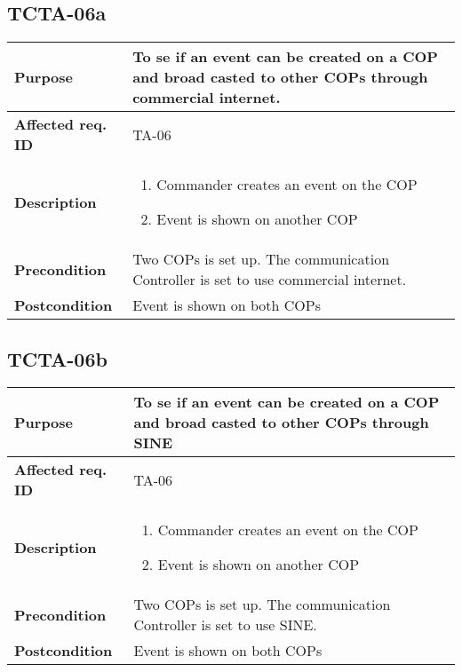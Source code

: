 \subsection{TCTA-06a}
\begin{tabular}{ l | m{11cm}}
	\textbf{Purpose}			& To se if an event can be created on a COP and broad casted to other COPs through commercial internet.  \\ \hline
	\textbf{Affected req. ID}	& TA-06 \\ \hline
	\textbf{Description}		& \begin{enumerate}
		\item Commander creates an event on the COP \item Event is shown on another COP
	\end{enumerate}\\
	\hline
	\textbf{Precondition}		& Two COPs is set up. The communication Controller is set to use commercial internet.\\ \hline
	\textbf{Postcondition}		& Event is shown on both COPs\\
\end{tabular}

\subsection{TCTA-06b}
\begin{tabular}{ l | m{11cm}}
	\textbf{Purpose}			& To se if an event can be created on a COP and broad casted to other COPs through SINE  \\ \hline
	\textbf{Affected req. ID}	& TA-06 \\ \hline
	\textbf{Description}		& \begin{enumerate}
		\item Commander creates an event on the COP \item Event is shown on another COP
	\end{enumerate}\\
	\hline
	\textbf{Precondition}		& Two COPs is set up. The communication Controller is set to use SINE.\\ \hline
	\textbf{Postcondition}		& Event is shown on both COPs\\
\end{tabular}

